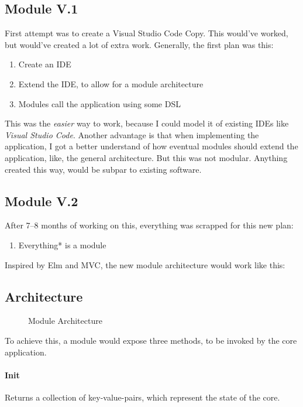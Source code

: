\subsection{Module V.1}

First attempt was to create a Visual Studio Code Copy. This would've worked, but
would've created a lot of extra work.
Generally, the first plan was this:
\begin{enumerate}
  \item Create an IDE
  \item Extend the IDE, to allow for a module architecture
  \item Modules call the application using some DSL
\end{enumerate}

This was the \textit{easier} way to work, because I could model it of existing
IDEs like \textit{Visual Studio Code}. Another advantage is that when
implementing the application, I got a better understand of how eventual modules
should extend the application, like, the general architecture. But this was not
modular. Anything created this way, would be subpar to existing software.

\subsection{Module V.2}

After 7–8 months of working on this, everything was scrapped for this new plan:
\begin{enumerate}
  \item Everything* is a module
\end{enumerate}

Inspired by Elm and MVC, the new module architecture would work like this:

\subsection{Architecture}
\begin{figure}
  \centering
  
  \caption{Module Architecture}
\end{figure}

To achieve this, a module would expose three methods, to be invoked by the core
application.

\paragraph{Init} Returns a collection of key-value-pairs, which represent
the state of the core.

